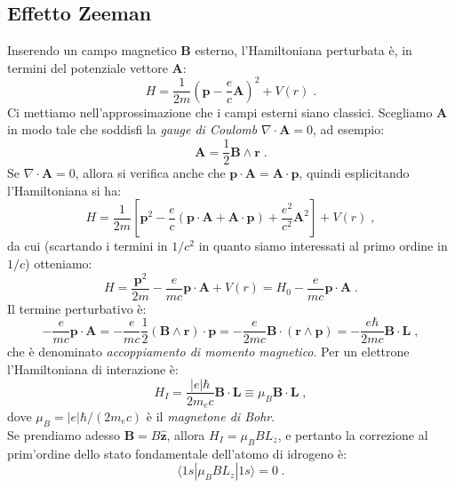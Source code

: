 \documentclass[10pt,a4paper]{report}
\theoremstyle{definition}
\numberwithin{equation}{section}
\newcommand{\bra}{\langle}
\newcommand{\ket}{\rangle}
\begin{document}
\subsection{Effetto Zeeman}
Inserendo un campo magnetico $\mathbf{B}$ esterno, l'Hamiltoniana perturbata è, in termini del potenziale vettore $\mathbf{A}$:
\begin{equation}
H=\frac{1}{2m}\left(\mathbf{p}-\frac{e}{c}\mathbf{A}\right)^2+V(r)\;.
\end{equation}
Ci mettiamo nell'approssimazione che i campi esterni siano classici. Scegliamo $\mathbf{A}$ in modo tale che soddisfi la \textit{gauge di Coulomb} $\nabla\cdot\mathbf{A}=0$, ad esempio:
\begin{equation}
\mathbf{A}=\frac{1}{2}\mathbf{B}\wedge \mathbf{r}\;.
\end{equation}
Se $\nabla\cdot \mathbf{A}=0$, allora si verifica anche che $\mathbf{p}\cdot\mathbf{A}=\mathbf{A}\cdot\mathbf{p}$, quindi esplicitando l'Hamiltoniana si ha:
\begin{equation}
H=\frac{1}{2m}\left[\mathbf{p}^2-\frac{e}{c}(\mathbf{p}\cdot\mathbf{A}+\mathbf{A}\cdot\mathbf{p})+\frac{e^2}{c^2}\mathbf{A}^2\right]+V(r)\;,
\end{equation}
da cui (scartando i termini in $1/c^2$ in quanto siamo interessati al primo ordine in $1/c$) otteniamo:
\begin{equation}
H=\frac{\mathbf{p}^2}{2m}-\frac{e}{mc}\mathbf{p}\cdot\mathbf{A}+V(r)=H_0-\frac{e}{mc}\mathbf{p}\cdot\mathbf{A}\;.
\end{equation}
Il termine perturbativo è:
\begin{equation}
-\frac{e}{mc}\mathbf{p}\cdot\mathbf{A}=-\frac{e}{mc}\frac{1}{2}(\mathbf{B}\wedge\mathbf{r})\cdot\mathbf{p}=-\frac{e}{2mc}\mathbf{B}\cdot(\mathbf{r}\wedge\mathbf{p})=-\frac{e\hbar}{2mc}\mathbf{B}\cdot\mathbf{L}\;,
\end{equation}
che è denominato \textit{accoppiamento di momento magnetico}. Per un elettrone l'Hamiltoniana di interazione è:
\begin{equation}
H_I=\frac{|e|\hbar}{2m_ec}\mathbf{B}\cdot\mathbf{L}\equiv \mu_B\mathbf{B}\cdot\mathbf{L}\;,
\end{equation}
dove $\mu_B=|e|\hbar/(2m_ec)$ è il \textit{magnetone di Bohr}. \\
Se prendiamo adesso $\mathbf{B}=B\hat{\mathbf{z}}$, allora $H_I=\mu_BBL_z$, e pertanto la correzione al prim'ordine dello stato fondamentale dell'atomo di idrogeno è:
\begin{equation}
\bra 1s|\mu_BBL_z|1s\ket=0\;.
\end{equation}
\end{document}
